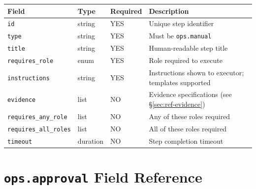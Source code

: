 \begin{center}
\small
\begin{tabular}{lllp{5cm}}
\textbf{Field} & \textbf{Type} & \textbf{Required} & \textbf{Description} \\
\hline
\texttt{id} & string & YES & Unique step identifier \\
\texttt{type} & string & YES & Must be \texttt{ops.manual} \\
\texttt{title} & string & YES & Human-readable step title \\
\texttt{requires\_role} & enum & YES & Role required to execute \\
\texttt{instructions} & string & YES & Instructions shown to executor; templates supported \\
\texttt{evidence} & list & NO & Evidence specifications (see §\ref{sec:ref-evidence}) \\
\texttt{requires\_any\_role} & list & NO & Any of these roles required \\
\texttt{requires\_all\_roles} & list & NO & All of these roles required \\
\texttt{timeout} & duration & NO & Step completion timeout \\
\end{tabular}
\end{center}

\section{\texttt{ops.approval} Field Reference}
\label{sec:ref-ops-approval}

